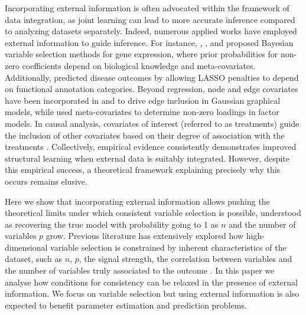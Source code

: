 \documentclass[aos]{imsart}
\theoremstyle{plain}
\begin{document}
Incorporating external information is often advocated within the framework of data integration, as joint learning can lead to more accurate inference compared to analyzing datasets separately. Indeed, numerous applied works have employed external information to guide inference. For instance, \cite{stingo:2011}, \cite{quintana}, and \cite{cassese:2014} proposed Bayesian variable selection methods for gene expression, where prior probabilities for non-zero coefficients depend on biological knowledge and meta-covariates. Additionally, \cite{chen_tinghuei:2021} predicted disease outcomes by allowing LASSO penalties to depend on functional annotation categories. Beyond regression, node and edge covariates have been incorporated in \cite{peterson} and \cite{jewson2023graphical} to drive edge inclusion in Gaussian graphical models, while \cite{schiavon2022generalized} used meta-covariates to determine non-zero loadings in factor models. In causal analysis, covariates of interest (referred to as treatments) guide the inclusion of other covariates based on their degree of association with the treatments \cite{belloni2014inference,antonelli2021bayesian}. Collectively, empirical evidence consistently demonstrates improved structural learning when external data is suitably integrated. However, despite this empirical success, a theoretical framework explaining precisely why this occurs remains elusive.

Here we show that incorporating external information allows pushing the theoretical limits under which consistent variable selection is possible, understood as recovering the true model with probability going to 1 as $n$ and the number of variables $p$ grow. Previous literature has extensively explored how high-dimensional variable selection is constrained by inherent characteristics of the dataset, such as $n$, $p$, the signal strength, the correlation between variables and the number of variables truly associated to the outcome \cite{buhlmannvandegeerbook,overviewvarsel,handbookbayesvarsel,wainwrighthighdimbook}. In this paper we analyse how conditions for consistency can be relaxed in the presence of external information. We focus on variable selection but using external information is also expected to benefit parameter estimation and prediction problems. 
\end{document}
